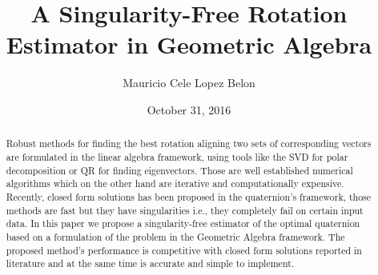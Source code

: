 \documentclass{birkjour}
\numberwithin{equation}{section}
\begin{document}
%
%
%
%
%
%
%
%
%


\title[A Singularity-Free Rotation Estimator in Geometric Algebra]
 {A Singularity-Free Rotation Estimator in Geometric Algebra}

\author[Mauricio Cele Lopez Belon]{Mauricio Cele Lopez Belon}
\address{Madrid, España}




\date{October 31, 2016}

\begin{abstract}

Robust methods for finding the best rotation aligning two sets of corresponding vectors are formulated in the linear algebra framework, using tools like the SVD for polar decomposition or QR for finding eigenvectors. Those are well established numerical algorithms which on the other hand are iterative and computationally expensive. Recently, closed form solutions has been proposed in the quaternion's framework, those methods are fast but they have singularities i.e., they completely fail on certain input data. In this paper we propose a singularity-free estimator of the optimal quaternion based on a formulation of the problem in the Geometric Algebra framework. The proposed method's performance is competitive with closed form solutions reported in literature and at the same time is accurate and simple to implement.

\end{abstract}
\end{document}
